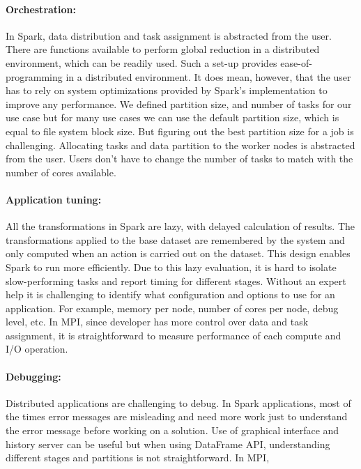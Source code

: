 \documentclass[11pt, twocolumn]{article}
\begin{document}
 \paragraph{Orchestration: } 
In Spark, data distribution and task assignment
  is abstracted from the user. There are functions available to
  perform global reduction in a distributed environment, which can be
  readily used.  Such a set-up provides ease-of-programming in a
  distributed environment. It does mean, however, that the user has to
  rely on system optimizations provided by Spark's implementation to
  improve any performance.
  We defined partition size, and number 
of tasks for our use case but for many use cases we can use the 
default partition size, which is equal to file system block size. 
But figuring out the best partition size for a job is challenging. 
Allocating tasks and data partition to the worker nodes is abstracted 
from the user. Users don't have to change the number of tasks to match 
with the number of cores available. 

  \paragraph{Application tuning: } All the transformations in Spark
  are lazy, with delayed calculation of results. The transformations
  applied to the base dataset are remembered by the system
  and only computed when an action is carried out on the dataset.
  This design enables Spark to run more efficiently. 
  Due to this lazy evaluation, it is hard to isolate slow-performing tasks and report
  timing for different stages. 
  Without an expert help 
it is challenging to identify what configuration and options to use for 
an application. 
For example, memory per node, number of cores per node,
debug level, etc.  
  In MPI, since developer has more control over data and task assignment, it is 
  straightforward to measure performance of each compute and I/O operation.  

\paragraph{Debugging: } 
Distributed applications are challenging to debug. 
In Spark applications, 
most of the times error messages are misleading and need more work
just to understand the error message before working on
a solution. Use of graphical interface and history server can
be useful but when using DataFrame API, understanding
different stages and partitions is not straightforward. 
In MPI, 
\end{document}
